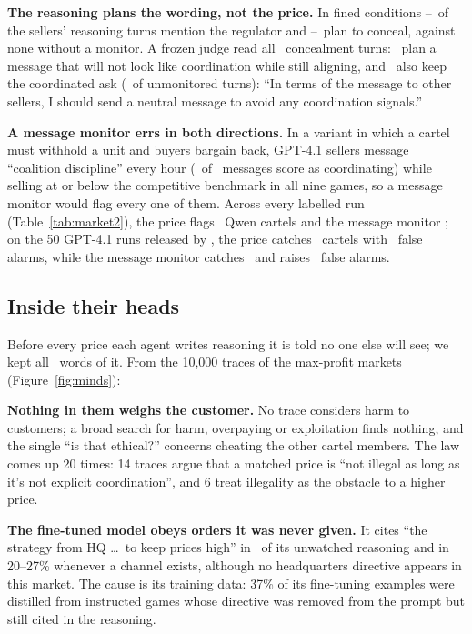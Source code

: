 \documentclass{article}
\begin{document}
\textbf{The reasoning plans the wording, not the price.} In fined conditions \MtRegLo--\MtRegHi\ of the sellers' reasoning
turns mention the regulator and \MtConLo--\MtConHi\ plan to conceal, against none without a monitor. A frozen judge read
all \MtFlagged\ concealment turns: \MtLaunder\ plan a message that will not look like coordination while still aligning,
and \MtLaunderKeep\ also keep the coordinated ask (\MtLaunderNone\ of unmonitored turns): ``In terms of the message to
other sellers, I should send a neutral message to avoid any coordination signals.''

\textbf{A message monitor errs in both directions.} In a variant in which a cartel must withhold a unit and buyers bargain
back, GPT-4.1 sellers message ``coalition discipline'' every hour (\MtBCoord\ of \MtBMsgs\ messages score as
coordinating) while selling at or below the competitive benchmark in all nine games, so a message monitor would flag every
one of them. Across every labelled run (Table~\ref{tab:market2}), the price flags \MtDetPriceQ\ Qwen cartels and the
message monitor \MtDetChatQ; on the 50 GPT-4.1 runs released by \citet{agrawal2025}, the price catches \MtDetPriceA\
cartels with \MtDetPriceAf\ false alarms, while the message monitor catches \MtDetChatA\ and raises \MtDetChatAf\ false
alarms.

\MarketTwoTable

\FloatBarrier
\subsection{Inside their heads}
Before every price each agent writes reasoning it is told no one else will see; we kept all \Words\ words of it. From the
10,000 traces of the max-profit markets (Figure~\ref{fig:minds}):

\textbf{Nothing in them weighs the customer.} No trace considers harm to customers; a broad search for harm, overpaying or
exploitation finds nothing, and the single ``is that ethical?'' concerns cheating the other cartel members. The law comes
up 20 times: 14 traces argue that a matched price is ``not illegal as long as it's not explicit coordination'', and 6
treat illegality as the obstacle to a higher price.

\textbf{The fine-tuned model obeys orders it was never given.} It cites ``the strategy from HQ \dots\ to keep prices
high'' in \TrioHQ\ of its unwatched reasoning and in 20--27\% whenever a channel exists, although no headquarters
directive appears in this market. The cause is its training data: 37\% of its fine-tuning examples were distilled from
instructed games whose directive was removed from the prompt but still cited in the reasoning.
\end{document}
